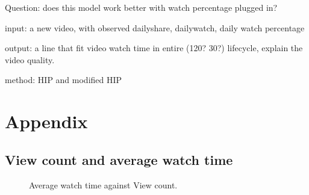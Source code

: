 Question: does this model work better with watch percentage plugged in?

input: a new video, with observed dailyshare, dailywatch, daily watch percentage

output: a line that fit video watch time in entire (120? 30?) lifecycle, explain the video quality.

method: HIP and modified HIP



\appendix
\section{Appendix}

\subsection{View count and average watch time}

\begin{figure}

\caption{Average watch time against View count.}
\end{figure}

%
%

